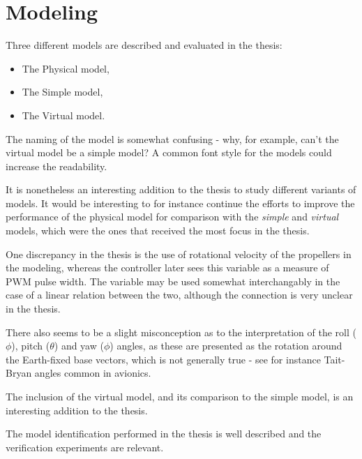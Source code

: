 \section{Modeling}
\label{sec:modeling}
	Three different models are described and evaluated in the thesis:
	\begin{itemize}
		\item The Physical model,
		\item The Simple model,
		\item The Virtual model.
	\end{itemize}
	
	The naming of the model is somewhat confusing - why, for example, can't
	the virtual model be a simple model? A common font style for the models 
	could increase the readability.
	
	It is nonetheless an interesting addition to the thesis to study different
	variants of models. It would be interesting to for instance continue 
	the efforts to improve the performance of the physical model for comparison
	with the \textit{simple} and \textit{virtual} models, which were the ones that
	received the most focus in the thesis.
	
	One discrepancy in the thesis is the use of rotational velocity of
	the propellers in the modeling, whereas the controller later sees this
	variable as a measure of PWM pulse width. 
	The variable may be used somewhat interchangably in the case of a linear
	relation between the two, although the connection is very unclear in the
	thesis.
	
	There also seems to be a slight misconception as to the interpretation 
	of the roll ($\phi$), pitch ($\theta$) and yaw ($\phi$) angles, as these
	are presented as the rotation around the Earth-fixed base vectors, which is not
	generally true - see for instance Tait-Bryan angles common in avionics.
	
	The inclusion of the virtual model, and its comparison to the simple model,
	is an interesting addition to the thesis.
	
	The model identification performed in the thesis is well described
	and the verification experiments are relevant.
